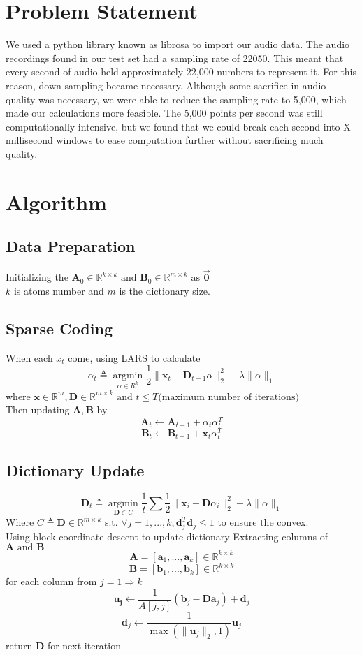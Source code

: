 \documentclass[UTF8]{article}
\begin{document}
\section{Problem Statement}
We used a python library known as librosa\cite{mcfee2015librosa} to import our audio data. The audio recordings found in our test set had a sampling rate of 22050. This meant that every second of audio held approximately 22,000 numbers to represent it. For this reason, down sampling became necessary. Although some sacrifice in audio quality was necessary, we were able to reduce the sampling rate to 5,000, which made our calculations more feasible. The 5,000 points per second was still computationally intensive, but we found that we could break each second into X millisecond windows to ease computation further without sacrificing much quality.


\section{Algorithm}

\subsection{Data Preparation}

Initializing the $\bm{A}_0 \in \mathbb{R}^{k \times k} \text{ and } \bm{B}_0 \in \mathbb{R}^{m \times k} \text{ as } \vec{\bm{0}} $\\
$k$ is atoms number and $m$ is the dictionary size.

\subsection{Sparse Coding}
When each $x_t$ come, using LARS\cite{scikit-learn} to calculate
\[
	\alpha_t \triangleq \mathop{\arg\min}\limits_{\alpha\in R^k} \frac{1}{2} \| \bm{x}_t - \bm{D}_{t-1} \alpha  \|^2_2 + \lambda \|\alpha\|_1
\]
where $\bm{x} \in \mathbb{R}^{m}, \bm{D} \in \mathbb{R}^{m \times k} \text{ and } t \leq T \text{(maximum number of iterations)}$
\\
Then updating $\bm{A}, \bm{B}$ by
\[\bm{A}_t \leftarrow \bm{A}_{t-1} + \alpha_t \alpha_t^T\]
\[\bm{B}_t \leftarrow \bm{B}_{t-1} + \bm{x}_t \alpha_t^T\]

\subsection{Dictionary Update}
\[\bm{D}_t \triangleq \mathop{\arg\min}\limits_{\bm{D} \in C} \frac{1}{t} \sum{ \frac{1}{2} \| \bm{x}_i - \bm{D} \alpha_i  \|^2_2 + \lambda \|\alpha\|_1}
\]
Where $C \triangleq {\bm{D} \in \mathbb{R}^{m \times k} \text{ s.t. } \forall j = 1, ..., k, \bm{d}_j^T\bm{d}_j \leq 1}$ to ensure the convex.
\\
Using block-coordinate descent to update dictionary
Extracting columns of $\bm{A} \text{ and } \bm{B}$
\[\bm{A} = [\bm{a}_1, ..., \bm{a}_k] \in \mathbb{R}^{k \times k}\]
\[\bm{B} = [\bm{b}_1, ..., \bm{b}_k] \in \mathbb{R}^{k \times k}\]
for each column from $j = 1 \Rightarrow k$
\[\bm{u_j} \leftarrow \frac{1}{A[j, j]}(\bm{b}_j - \bm{Da}_j) + \bm{d}_j\]
\[\bm{d}_j \leftarrow \frac{1}{\max(\|\bm{u}_j\|_2, 1)}\bm{u}_j\]
return $\bm{D}$ for next iteration
\end{document}
